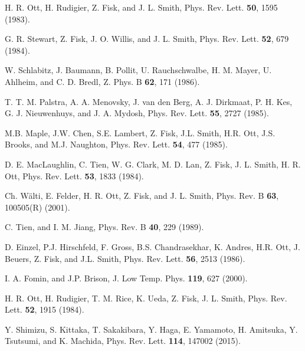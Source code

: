 \documentclass[twocolumn, prl]{revtex4}%
\begin{document}
\begin{thebibliography}{99}




 H. R. Ott, H. Rudigier, Z. Fisk, and J. L. Smith, Phys. Rev. Lett. {\bf50}, 1595 (1983).

 G. R. Stewart, Z. Fisk, J. O. Willis, and J. L. Smith,  Phys. Rev. Lett. {\bf52}, 679 (1984).

 W. Schlabitz, J. Baumann, B. Pollit, U. Rauchschwalbe, H. M. Mayer, U. Ahlheim, and C. D. Bredl, Z. Phys. B {\bf62}, 171 (1986).

T. T. M. Palstra, A. A. Menovsky, J. van den Berg, A. J. Dirkmaat, P. H. Kes, G. J. Nieuwenhuys, and J. A. Mydosh, Phys. Rev. Lett. {\bf55}, 2727 (1985).


 M.B. Maple, J.W. Chen, S.E. Lambert, Z. Fisk, J.L. Smith, H.R. Ott, J.S. Brooks, and M.J. Naughton, Phys. Rev. Lett. {\bf 54}, 477 (1985).

 D. E. MacLaughlin, C. Tien, W. G. Clark, M. D. Lan, Z. Fisk, J. L. Smith, H. R. Ott,
 Phys. Rev. Lett. {\bf 53}, 1833 (1984).

 Ch.  W\"{a}lti, E. Felder, H. R. Ott, Z. Fisk, and J. L. Smith, Phys. Rev. B {\bf63}, 100505(R) (2001).


 C. Tien, and I. M. Jiang, Phys. Rev. B {\bf40}, 229 (1989).

 D. Einzel, P.J. Hirschfeld, F. Gross, B.S. Chandrasekhar, K. Andres, H.R. Ott, J. Beuers, Z. Fisk, and J.L. Smith, Phys. Rev. Lett. {\bf 56}, 2513 (1986).

 I. A. Fomin, and J.P. Brison, J. Low Temp. Phys. {\bf 119}, 627 (2000).

 H. R. Ott, H. Rudigier, T. M. Rice, K. Ueda, Z. Fisk, J. L. Smith, 
 Phys. Rev. Lett. {\bf 52}, 1915 (1984).

 
 
 Y. Shimizu, S. Kittaka, T. Sakakibara, Y. Haga, E. Yamamoto, H. Amitsuka, Y. Tsutsumi, and K. Machida, 
 Phys. Rev. Lett. {\bf114}, 147002 (2015).
\color{black}



\end{thebibliography}
\end{document}
